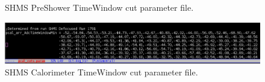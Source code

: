 \documentclass[14pt]{article}
\begin{document}
\begin{appendices}
\begin{figure}[H]
  \caption{SHMS PreShower TimeWindow cut parameter file.}
  \label{fig:shms_prsh_parm_cut}
\end{figure}
\begin{figure}[H]
  \captionsetup{justification=raggedright,singlelinecheck=false}
  \includegraphics[scale=0.4]{plots/pcal_parm_cut.png}
  \caption{SHMS Calorimeter TimeWindow cut parameter file.}
  \label{fig:shms_cal_parm_cut}
\end{figure}

\end{appendices}






 
\end{document}
